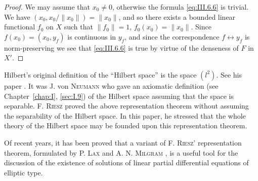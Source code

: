 \begin{proof}
 We may assume that $x_0 \neq 0$, otherwise the formula \eqref{eq:III.6.6} is trivial. We have $(x_0, x_0 / \|x_0\|) = \|x_0\|$, and so there exists a bounded linear functional $f_0$ on $X$ such that $\|f_0\| = 1$, $f_0(x_0) = \|x_0\|$. Since $f(x_0) = (x_0, y_f)$ is continuous in $y_f$, and since the correspondence $f \leftrightarrow y_f$ is norm-preserving we see that \eqref{eq:III.6.6} is true by virtue of the denseness of $F$ in $X'$. 
\end{proof}

\begin{remarku} Hilbert's original definition of the ``Hilbert space'' is the space $(l^2)$. See his paper \cite{hilbert96}. It was J. von \textsc{Neumann} \cite{neumann228} who gave an axiomatic definition (see Chapter~\ref{chap:I}, \ref{sec:I.9}) of the Hilbert space assuming that the space is separable. F. \textsc{Riesz} \cite{rickart272} proved the above representation theorem without assuming the separability of the Hilbert space. In this paper, he stressed that the whole theory of the Hilbert space may be founded upon this representation theorem. 
\end{remarku}


\label{sec:III.7}

Of recent years, it has been proved that a variant of F. \textsc{Riesz}' representation theorem, formulated by P. \textsc{Lax} and A. N. \textsc{Milgram} \cite{lax171}, is a useful tool for the discussion of the existence of solutions of linear partial differential equations of elliptic type. 

